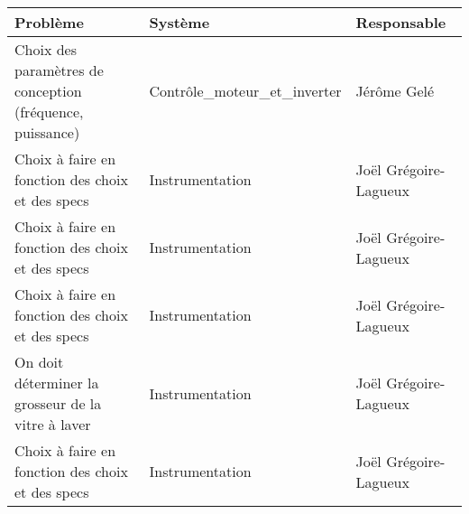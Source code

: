 \begin{tabularx}{\linewidth}{
    |>{\hsize=2.0\hsize}X|%
    >{\hsize=0.5\hsize}X|%
    >{\hsize=0.5\hsize}X|%
  }
    \hline
    \textbf{Problème} & \textbf{Système} & \textbf{Responsable} \\\hline
    Choix des paramètres de conception (fréquence, puissance) & Contrôle_moteur_et_inverter & Jérôme Gelé \\\hline
    Choix à faire en fonction des choix et des specs & Instrumentation & Joël Grégoire-Lagueux \\\hline
    Choix à faire en fonction des choix et des specs & Instrumentation & Joël Grégoire-Lagueux \\\hline
    Choix à faire en fonction des choix et des specs & Instrumentation & Joël Grégoire-Lagueux \\\hline
    On doit déterminer la grosseur de la vitre à laver & Instrumentation & Joël Grégoire-Lagueux \\\hline
    Choix à faire en fonction des choix et des specs & Instrumentation & Joël Grégoire-Lagueux \\\hline
\end{tabularx}
     